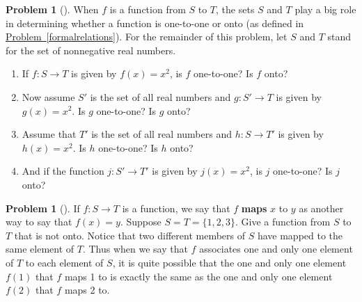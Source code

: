 \documentclass[10pt,]{book}
\newcommand{\terminology}[1]{\textbf{#1}}
\theoremstyle{plain}
\theoremstyle{definition}
\newtheorem{activity}[project]{Problem}
\theoremstyle{definition}
\numberwithin{equation}{chapter}
\begin{document}
\begin{activity}[]\marginsymbol[-1em]{} \label{activity-330}
When \(f\) is a function from \(S\) to \(T\), the sets \(S\) and \(T\) play a big role in determining whether a function is one-to-one or onto (as defined in \hyperref[formalrelations]{Problem~\ref{formalrelations}}). For the remainder of this problem, let \(S\) and \(T\) stand for  the set of nonnegative real numbers.%
\begin{enumerate}[font=\bfseries,label=(\alph*),ref=\alph*]
\item\label{task-240} \marginsymbol[-2.5em]{} If \(f:S\rightarrow T\) is given by \(f(x) =x^2\), is \(f\) one-to-one? Is \(f\) onto?%
\item\label{task-241} \marginsymbol[-2.5em]{} Now assume \(S'\) is the set of all real numbers and \(g:S'\rightarrow T\) is given by \(g(x) = x^2\). Is \(g\) one-to-one? Is \(g\) onto?%
\item\label{task-242} \marginsymbol[-2.5em]{} Assume that \(T'\) is the set of all real numbers and \(h:S\rightarrow T'\) is given by \(h(x) = x^2\). Is \(h\) one-to-one? Is \(h\) onto?%
\item\label{task-243} \marginsymbol[-2.5em]{} And if the function \(j:S'\rightarrow T'\) is given by \(j(x)=x^2\), is \(j\) one-to-one? Is \(j\) onto?%
\end{enumerate}
\end{activity}
\begin{activity}[]\marginsymbol[-1em]{} \label{activity-331}
If \(f:S\rightarrow T\) is a function, we say that \(f\) \terminology{maps} \(x\) to \(y\) as another way to say that \(f(x)=y\). Suppose \(S=T=\{1,2,3\}\). Give a function from \(S\) to \(T\) that is not onto. Notice that two different members of \(S\) have mapped to the same element of \(T\). Thus when we say that \(f\) associates one and only one element of \(T\) to each element of \(S\), it is quite possible that the one and only one element \(f(1)\) that \(f\) maps 1 to is exactly the same as the one and only one element \(f(2)\) that \(f\) maps 2 to.%
\end{activity}
\typeout{************************************************}
\typeout{************************************************}
\end{document}
